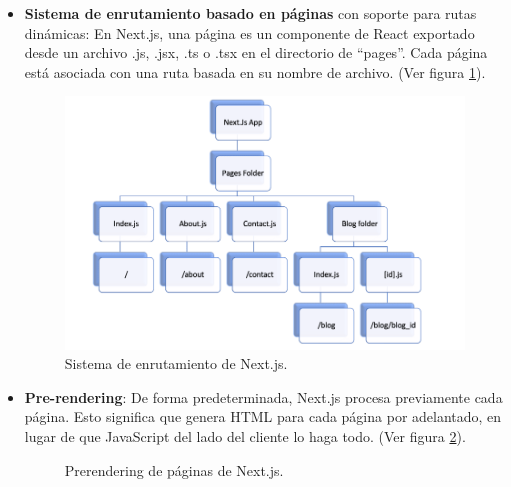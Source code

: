 \documentclass[12pt,twoside,titlepage]{report}
\begin{document}
\begin{itemize}
    \item \textbf{Sistema de enrutamiento basado en páginas} con soporte para rutas dinámicas: En Next.js, una página es un componente de React exportado desde un archivo .js, .jsx, .ts o .tsx en el directorio de ``pages''. Cada página está asociada con una ruta basada en su nombre de archivo. (Ver figura \ref{fig:nextjs_routing}).
    \begin{figure}[H]
        \centering
        \includegraphics[scale=0.3]{Nextjs/Routing}
        \caption{Sistema de enrutamiento de Next.js.}
        \label{fig:nextjs_routing}
    \end{figure}
    
    \item \textbf{Pre-rendering}: De forma predeterminada, Next.js procesa previamente cada página. Esto significa que genera HTML para cada página por adelantado, en lugar de que JavaScript del lado del cliente lo haga todo. (Ver figura \ref{fig:Prerendering}).
    \begin{figure}[H]
        \centering
        \caption{Prerendering de páginas de Next.js.}
        \label{fig:Prerendering}
       \end{figure}


\end{itemize}
\end{document}
